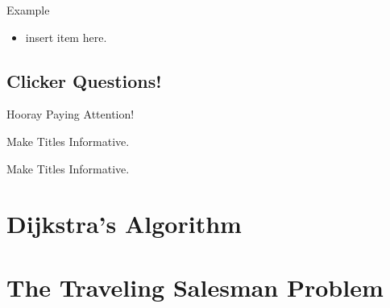 \documentclass{beamer}
\begin{document}
\begin{frame}{Example}
  \begin{itemize}
  \item      
	insert item here.
  \end{itemize}
\end{frame}




\subsection{Clicker Questions!}{Hooray Paying Attention!}

\begin{frame}{Make Titles Informative.}
\end{frame}

\begin{frame}{Make Titles Informative.}
\end{frame}


\section{Dijkstra's Algorithm}

\section{The Traveling Salesman Problem}
\end{document}
